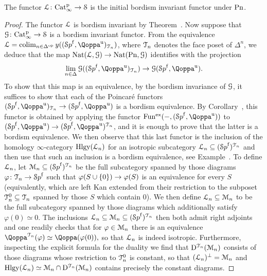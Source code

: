 \begin{proposition}
\label{proposition:universal-L-space}%
The functor $\operatorname{\mathcal{L}} \colon \mathrm{Cat}^{\mathrm p}_\infty \rightarrow \mathcal S $ is the initial bordism invariant functor under $\mathrm{Pn}$.
\end{proposition}
\begin{proof}
The functor $\operatorname{\mathcal{L}}$ is bordism invariant by Theorem~. 
Now suppose that $\mathcal{G}\colon \mathrm{Cat}^{\mathrm p}_\infty \to \mathcal S$ is a bordism invariant functor. From the equivalence 
$\Lspace= \colim_{n \in \Delta\op} y((\Spaf,\QF^\uni)_{\T_n})$, where $\mathcal{T}_n$ denotes the face poset of $\Delta^n$, we deduce that the map
$\operatorname{Nat}(\operatorname{\mathcal{L}},\mathcal{G}) \to \operatorname{Nat}(\mathrm{Pn},\mathcal{G})$
identifies with the projection
\[
\lim_{n \in \Del}\G((\Spaf,\QF^{\uni})_{\T_n}) \to \G(\Spaf,\QF^{\uni}).
\]
To show that this map is an equivalence, by the bordism invariance of $\mathcal{G}$, it suffices to show that each of the Poincaré functors $(\Spaf,\QF^{\uni})_{\T_n} \to (\Spaf,\QF^{\uni})$ is a bordism equivalence. By Corollary~, this functor is obtained by applying the functor $\Funx(-,(\Spaf,\QF^{\uni}))$ to $(\Spaf,\QF^{\uni}) \to (\Spaf,\QF^{\uni})^{\T_n}$, and it is enough to prove that the latter is a bordism equivalence.
We then observe that this last functor is the inclusion of the homology $\infty$-category $\operatorname{Hlgy}(\mathcal{L}_n)$ for an isotropic subcategory $\mathcal{L}_n \subseteq ({\mathcal Sp}^{\mathrm{f}})^{\mathcal{T}_n}$ and then use that such an inclusion is a bordism equivalence, see Example~. To define $\mathcal{L}_n$, let $\mathcal{M}_n \subseteq ({\mathcal Sp}^{\mathrm{f}})^{\mathcal{T}_n}$ be the full subcategory spanned by those diagrams $\varphi\colon  \mathcal{T}_{n} \rightarrow {\mathcal Sp}^{\mathrm{f}}$ such that $\varphi(S \cup \{0\}) \rightarrow \varphi(S)$ is an equivalence for every $S$ (equivalently, which are left Kan extended from their restriction to the subposet $\mathcal{T}^0_n \subseteq \mathcal{T}_n$ spanned by those $S$ which contain $0$). We then define $\mathcal{L}_n \subseteq \mathcal{M}_n$ 
to be the full subcategory spanned by those diagrams which additionally satisfy $\varphi(0) \simeq 0$. 
The inclusions $\mathcal{L}_n \subseteq \mathcal{M}_n \subseteq ({\mathcal Sp}^{\mathrm{f}})^{\mathcal{T}_n}$ then both admit right adjoints and one readily checks that for $\varphi \in \mathcal{M}_n$ there is an equivalence
$
\QF^{\T_n}(\varphi) \simeq \QF(\varphi(0)),
$
so that $\mathcal{L}_n$ is indeed isotropic. Furthermore, inspecting the explicit formula for the duality we find that $\mathrm{D}^{\mathcal{T}_n}(\mathcal{M}_n)$ consists of those diagrams whose restriction to $\mathcal{T}^0_n$ is constant, so that
$(\mathcal{L}_n)^\perp = \mathcal{M}_n$ and 
$\operatorname{Hlgy}(\mathcal{L}_n) \simeq \mathcal{M}_n \cap \mathrm{D}^{\mathcal{T}_n}(\mathcal{M}_n)$ contains precisely the constant diagrams.
\end{proof}




